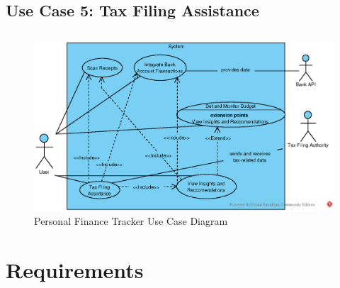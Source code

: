 \subsection{Use Case 5: Tax Filing Assistance}
\newpage

\subsection{}
\begin{figure}[!h]
    \centering
    \includegraphics[width=0.7\linewidth]{eps/PFPUseCaseDiagram.eps}
    \caption{Personal Finance Tracker Use Case Diagram}
    \label{fig:PFP-usecase}
\end{figure}

\newpage

\section{Requirements}

